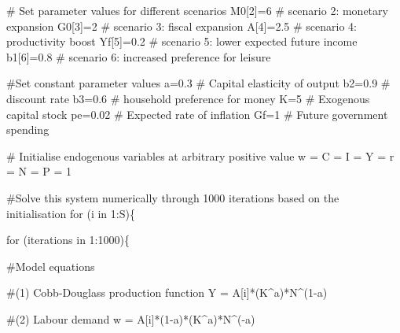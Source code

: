 \documentclass[
  letterpaper,
  DIV=11,
  numbers=noendperiod]{scrreprt}
\newenvironment{Shaded}{\begin{snugshade}}{\end{snugshade}}
\newcommand{\CommentTok}[1]{\textcolor[rgb]{0.37,0.37,0.37}{#1}}
\newcommand{\ControlFlowTok}[1]{\textcolor[rgb]{0.00,0.23,0.31}{#1}}
\newcommand{\DecValTok}[1]{\textcolor[rgb]{0.68,0.00,0.00}{#1}}
\newcommand{\FloatTok}[1]{\textcolor[rgb]{0.68,0.00,0.00}{#1}}
\newcommand{\NormalTok}[1]{\textcolor[rgb]{0.00,0.23,0.31}{#1}}
\newcommand{\OtherTok}[1]{\textcolor[rgb]{0.00,0.23,0.31}{#1}}
\newcommand{\SpecialCharTok}[1]{\textcolor[rgb]{0.37,0.37,0.37}{#1}}
\begin{document}
\begin{Shaded}
\begin{Highlighting}[]
\CommentTok{\# Set parameter values for different scenarios}
\NormalTok{M0[}\DecValTok{2}\NormalTok{]}\OtherTok{=}\DecValTok{6}   \CommentTok{\# scenario 2: monetary expansion }
\NormalTok{G0[}\DecValTok{3}\NormalTok{]}\OtherTok{=}\DecValTok{2}   \CommentTok{\# scenario 3: fiscal expansion}
\NormalTok{A[}\DecValTok{4}\NormalTok{]}\OtherTok{=}\FloatTok{2.5}  \CommentTok{\# scenario 4: productivity boost}
\NormalTok{Yf[}\DecValTok{5}\NormalTok{]}\OtherTok{=}\FloatTok{0.2} \CommentTok{\# scenario 5: lower expected future income}
\NormalTok{b1[}\DecValTok{6}\NormalTok{]}\OtherTok{=}\FloatTok{0.8} \CommentTok{\# scenario 6: increased preference for leisure}

\CommentTok{\#Set constant parameter values}
\NormalTok{a}\OtherTok{=}\FloatTok{0.3}  \CommentTok{\# Capital elasticity of output}
\NormalTok{b2}\OtherTok{=}\FloatTok{0.9} \CommentTok{\# discount rate}
\NormalTok{b3}\OtherTok{=}\FloatTok{0.6} \CommentTok{\# household preference for money}
\NormalTok{K}\OtherTok{=}\DecValTok{5}    \CommentTok{\# Exogenous capital stock}
\NormalTok{pe}\OtherTok{=}\FloatTok{0.02} \CommentTok{\# Expected rate of inflation}
\NormalTok{Gf}\OtherTok{=}\DecValTok{1}  \CommentTok{\# Future government spending}

\CommentTok{\# Initialise endogenous variables at arbitrary positive value}
\NormalTok{w }\OtherTok{=}\NormalTok{ C }\OtherTok{=}\NormalTok{ I }\OtherTok{=}\NormalTok{ Y }\OtherTok{=}\NormalTok{ r }\OtherTok{=}\NormalTok{ N }\OtherTok{=}\NormalTok{ P }\OtherTok{=} \DecValTok{1} 

\CommentTok{\#Solve this system numerically through 1000 iterations based on the initialisation}
\ControlFlowTok{for}\NormalTok{ (i }\ControlFlowTok{in} \DecValTok{1}\SpecialCharTok{:}\NormalTok{S)\{}
  
\ControlFlowTok{for}\NormalTok{ (iterations }\ControlFlowTok{in} \DecValTok{1}\SpecialCharTok{:}\DecValTok{1000}\NormalTok{)\{}
  
  \CommentTok{\#Model equations}
  
  \CommentTok{\#(1) Cobb{-}Douglass production function  }
\NormalTok{  Y }\OtherTok{=}\NormalTok{ A[i]}\SpecialCharTok{*}\NormalTok{(K}\SpecialCharTok{\^{}}\NormalTok{a)}\SpecialCharTok{*}\NormalTok{N}\SpecialCharTok{\^{}}\NormalTok{(}\DecValTok{1}\SpecialCharTok{{-}}\NormalTok{a)}
  
  \CommentTok{\#(2) Labour demand }
\NormalTok{  w }\OtherTok{=}\NormalTok{ A[i]}\SpecialCharTok{*}\NormalTok{(}\DecValTok{1}\SpecialCharTok{{-}}\NormalTok{a)}\SpecialCharTok{*}\NormalTok{(K}\SpecialCharTok{\^{}}\NormalTok{a)}\SpecialCharTok{*}\NormalTok{N}\SpecialCharTok{\^{}}\NormalTok{(}\SpecialCharTok{{-}}\NormalTok{a) }
  

\end{Highlighting}
\end{Shaded}
\end{document}
